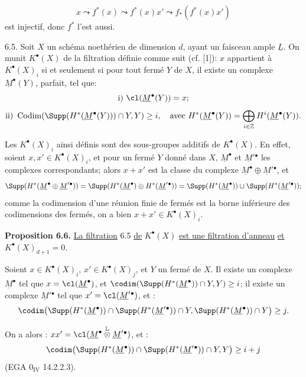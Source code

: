
\[
  x\leadsto f^*(x)\leadsto f^*(x)x'\leadsto f_*(f^*(x)x')
\]
est
injectif, donc $f^*$ l'est aussi.

6.5. Soit $X$ un schéma noethérien de dimension $d$, ayant un faisceau ample $\underline{L}$. On munit $K^{\bullet}(X)$ de la filtration définie comme suit (cf. [1]): $x$ appartient à $K^{\bullet}(X)_i$ si et seulement si pour tout fermé $Y$ de $X$, il existe un complexe $\underline{M}^\bullet(Y)$, parfait, tel que:
\[
  \text{i) } \cl(\underline{M}^\bullet(Y))=x;
\]
\[
  \text{ii) } \operatorname{Codim}(\Supp(H^*(\underline{M}^\bullet(Y)))\cap Y,Y)\ge i,
  \quad\text{avec } H^*(\underline{M}^\bullet(Y))=\bigoplus_{i\in\mathbb Z}H^i(\underline{M}^\bullet(Y)).
\]

Les $K^{\bullet}(X)_i$ ainsi définis sont des sous-groupes additifs de $K^{\bullet}(X)$. En effet, soient $x,x'\in K^{\bullet}(X)_i$, et pour un fermé $Y$ donné dans $X$, $\underline{M}^\bullet$ et $\underline{M}'{}^\bullet$ les complexes correspondants; alors $x+x'$ est la classe du complexe $\underline{M}^\bullet\oplus \underline{M}'{}^\bullet$, et
\[
\Supp(H^*(\underline{M}^\bullet\oplus \underline{M}'{}^\bullet))
 =\Supp(H^*(\underline{M}^\bullet)\oplus H^*(\underline{M}'{}^\bullet))
 =\Supp(H^*(\underline{M}^\bullet))\cup\Supp(H^*(\underline{M}'{}^\bullet));
\]
comme la codimension d'une réunion finie de fermés est la borne inférieure des codimensions des fermés, on a bien $x+x'\in K^{\bullet}(X)_i$.

\textbf{Proposition 6.6.} \uline{La filtration} 6.5 \uline{de} $K^{\bullet}(X)$ \uline{est une filtration d'anneau} \uline{et} $K^{\bullet}(X)_{d+1}=0$.

Soient $x\in K^{\bullet}(X)_i$, $x'\in K^{\bullet}(X)_j$, et $Y$ un fermé de $X$. Il existe un complexe $\underline{M}^\bullet$ tel que $x=\cl(\underline{M}^\bullet)$, et $\codim(\Supp(H^*(\underline{M}^\bullet))\cap Y,Y)\ge i$; il existe un complexe $\underline{M}'{}^\bullet$ tel que $x'=\cl(\underline{M}'{}^\bullet)$, et :
\[
\codim\bigl(\Supp(H^*(\underline{M}^\bullet))\cap\Supp(H^*(\underline{M}'{}^\bullet))\cap Y,
            \Supp(H^*(\underline{M}^\bullet))\cap Y\bigr)\ge j.
\]

On a alors : $xx'=\cl(\underline{M}^\bullet\overset{\mathbb L}{\otimes}\underline{M}'{}^\bullet)$, et :
\[
\codim\bigl(\Supp(H^*(\underline{M}^\bullet))\cap\Supp(H^*(\underline{M}'{}^\bullet))\cap Y,Y\bigr)\ge i+j
\]
(EGA $0_{\mathrm{IV}}$ 14.2.2.3).
